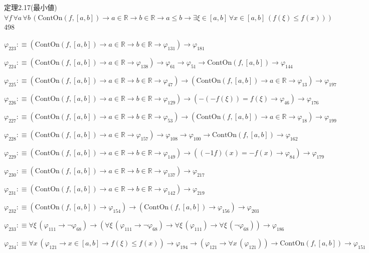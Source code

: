 \begin{fullproof}{定理2.17(最小値)}{$\forall f\,\forall a\,\forall b\,(\mathrm{ContOn}(f,[a,b]) \to a \in \mathbb{R} \to b \in \mathbb{R} \to a \leq b \to \exists \xi \in [a,b]\,\forall x \in [a,b]\,(f(\xi) \leq f(x)))$}{498}
\begin{abbrevlist}
\item $\varphi_{223} :\equiv (\mathrm{ContOn}(f,[a,b]) \to a \in \mathbb{R} \to b \in \mathbb{R} \to \varphi_{131}) \to \varphi_{181}$
\item $\varphi_{224} :\equiv (\mathrm{ContOn}(f,[a,b]) \to a \in \mathbb{R} \to \varphi_{138}) \to \varphi_{61} \to \varphi_{51} \to \mathrm{ContOn}(f,[a,b]) \to \varphi_{144}$
\item $\varphi_{225} :\equiv (\mathrm{ContOn}(f,[a,b]) \to a \in \mathbb{R} \to b \in \mathbb{R} \to \varphi_{47}) \to (\mathrm{ContOn}(f,[a,b]) \to a \in \mathbb{R} \to \varphi_{13}) \to \varphi_{197}$
\item $\varphi_{226} :\equiv (\mathrm{ContOn}(f,[a,b]) \to a \in \mathbb{R} \to b \in \mathbb{R} \to \varphi_{129}) \to (-(-f(\xi)) = f(\xi) \to \varphi_{46}) \to \varphi_{176}$
\item $\varphi_{227} :\equiv (\mathrm{ContOn}(f,[a,b]) \to a \in \mathbb{R} \to b \in \mathbb{R} \to \varphi_{53}) \to (\mathrm{ContOn}(f,[a,b]) \to a \in \mathbb{R} \to \varphi_{18}) \to \varphi_{199}$
\item $\varphi_{228} :\equiv (\mathrm{ContOn}(f,[a,b]) \to a \in \mathbb{R} \to \varphi_{157}) \to \varphi_{108} \to \varphi_{100} \to \mathrm{ContOn}(f,[a,b]) \to \varphi_{162}$
\item $\varphi_{229} :\equiv (\mathrm{ContOn}(f,[a,b]) \to a \in \mathbb{R} \to b \in \mathbb{R} \to \varphi_{149}) \to ((-1 f)(x) = -f(x) \to \varphi_{84}) \to \varphi_{179}$
\item $\varphi_{230} :\equiv (\mathrm{ContOn}(f,[a,b]) \to a \in \mathbb{R} \to b \in \mathbb{R} \to \varphi_{137}) \to \varphi_{217}$
\item $\varphi_{231} :\equiv (\mathrm{ContOn}(f,[a,b]) \to a \in \mathbb{R} \to b \in \mathbb{R} \to \varphi_{142}) \to \varphi_{219}$
\item $\varphi_{232} :\equiv (\mathrm{ContOn}(f,[a,b]) \to \varphi_{154}) \to (\mathrm{ContOn}(f,[a,b]) \to \varphi_{156}) \to \varphi_{203}$
\item $\varphi_{233} :\equiv \forall \xi\,(\varphi_{111} \to \neg \varphi_{68}) \to (\forall \xi\,(\varphi_{111} \to \neg \varphi_{68}) \to \forall \xi\,(\varphi_{111}) \to \forall \xi\,(\neg \varphi_{68})) \to \varphi_{186}$
\item $\varphi_{234} :\equiv \forall x\,(\varphi_{121} \to x \in [a,b] \to f(\xi) \leq f(x)) \to \varphi_{194} \to (\varphi_{121} \to \forall x\,(\varphi_{121})) \to \mathrm{ContOn}(f,[a,b]) \to \varphi_{151}$
\end{abbrevlist}
\end{fullproof}
